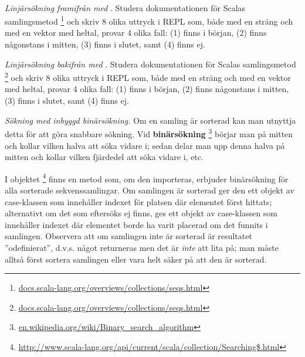 \QUESTEND





\QUESTBEGIN

\Task  \what~

\Subtask \emph{Linjärsökning framifrån med }. Studera dokumentationen för Scalas samlingsmetod \footnote{\href{http://docs.scala-lang.org/overviews/collections/seqs.html}{docs.scala-lang.org/overviews/collections/seqs.html}} och skriv 8 olika uttryck i REPL som, både med en sträng och med en vektor med heltal, provar 4 olika fall: (1) finns i början, (2) finns någonstans i mitten, (3) finns i slutet, samt (4) finns ej.

\Subtask \emph{Linjärsökning bakifrån med }. Studera dokumentationen för Scalas samlingsmetod \footnote{\href{http://docs.scala-lang.org/overviews/collections/seqs.html}{docs.scala-lang.org/overviews/collections/seqs.html}} och skriv 8 olika uttryck i REPL som, både med en sträng och med en vektor med heltal, provar 4 olika fall: (1) finns i början, (2) finns någonstans i mitten, (3) finns i slutet, samt (4) finns ej.

\Subtask \emph{Sökning med inbyggd binärsökning.} Om en samling är sorterad kan man utnyttja detta för att göra snabbare sökning. Vid \textbf{binärsökning} \footnote{\label{footnote:binarysearch}\href{https://en.wikipedia.org/wiki/Binary_search_algorithm}{en.wikipedia.org/wiki/Binary\_search\_algorithm}} börjar man på mitten och kollar vilken halva att  söka vidare i; sedan delar man upp denna halva på mitten och kollar vilken fjärdedel att söka vidare i, etc.

I objektet \footnote{\href{http://www.scala-lang.org/api/current/scala/collection/Searching\$.html}{http://www.scala-lang.org/api/current/scala/collection/Searching\$.html}} finns en metod  som, om den importeras, erbjuder binärsökning för alla sorterade sekvenssamlingar. Om samlingen är sorterad ger den ett objekt av case-klassen  som innehåller indexet för platsen där elementet först hittats; alternativt om det som eftersöks ej finns, ges ett objekt av case-klassen  som innehåller indexet där elementet borde ha varit placerad om det funnits i samlingen. Observera att om samlingen inte är sorterad är resultatet ''odefinierat'', d.v.s. något returneras men det är \emph{inte} att lita på; man måste alltså först sortera samlingen eller vara helt säker på att den är sorterad.

